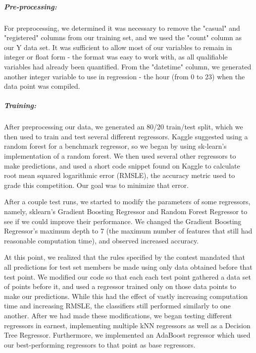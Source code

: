 \documentclass[11pt]{article}
\begin{document}
\noindent
\subparagraph*{Pre-processing: } For preprocessing, we determined it was necessary to remove the "casual" and "registered" columns from our training set, and we used the "count" column as our Y data set. It was sufficient to allow most of our variables to remain in integer or float form - the format was easy to work with, as all qualifiable variables had already been quantified. From the "datetime" column, we generated another integer variable to use in regression - the hour (from 0 to 23) when the data point was compiled.


\noindent

\subparagraph*{Training: } After preprocessing our data, we generated an 80/20 train/test split, which we then used to train and test several different regressors. Kaggle suggested using a random forest for a benchmark regressor, so we began by using sk-learn's implementation of a random forest. We then used several other regressors to make predictions, and used a short code snippet found on Kaggle to calculate root mean squared logarithmic error (RMSLE), the accuracy metric used to grade this competition. Our goal was to minimize that error.

After a couple test runs, we started to modify the parameters of some regressors, namely, sklearn's Gradient Boosting Regressor and Random Forest Regressor to see if we could improve their performance. We changed the Gradient Boosting Regressor's maximum depth to 7 (the maximum number of features that still had reasonable computation time), and observed increased accuracy.

At this point, we realized that the rules specified by the contest mandated that all predictions for test set members be made using only data obtained before that test point. We modified our code so that each each test point gathered a data set of points before it, and used a regressor trained only on those data points to make our predictions. While this had the effect of vastly increasing computation time and increasing RMSLE, the classifiers still performed similarly to one another.
After we had made these modifications, we began testing different regressors in earnest, implementing multiple kNN regressors as well as a Decision Tree Regressor. Furthermore, we implemented an AdaBoost regressor which used our best-performing regressors to that point as base regressors.
\end{document}
